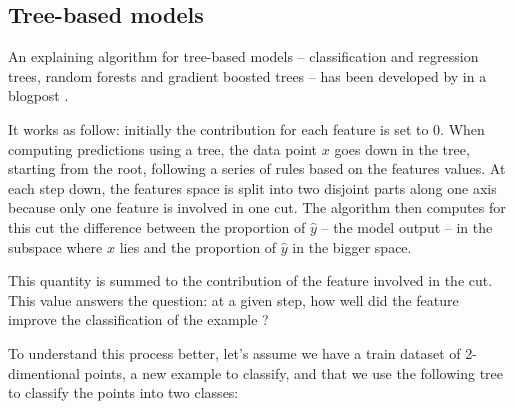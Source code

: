 \documentclass[a4paper,11pt]{kth-mag}
\begin{document}
\subsection{Tree-based models}

An explaining algorithm for tree-based models -- classification and regression trees, random forests and gradient boosted trees -- has been developed by \citeauthor{treeinterpreter} in a blogpost \cite{treeinterpreter}.


It works as follow: initially the contribution for each feature is set to 0. When computing predictions using a tree, the data point $x$ goes down in the tree, starting from the root, following a series of rules based on the features values. At each step down, the features space is split into two disjoint parts along one axis because only one feature is involved in one cut. The algorithm then computes for this cut the difference between the proportion of $\hat{y}$ -- the model output -- in the subspace where $x$ lies and the proportion of $\hat{y}$ in the bigger space.

This quantity is summed to the contribution of the feature involved in the cut. This value answers the question: at a given step, how well did the feature improve the classification of the example ?

To understand this process better, let's assume we have a train dataset of 2-dimentional points, a new example to classify, and that we use the following tree to classify the points into two classes:
\end{document}

